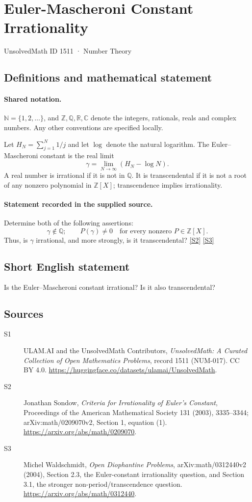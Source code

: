 \documentclass[11pt]{article}
\newcommand{\sref}[2]{\hyperlink{source:#1:#2}{[S#2]}}
\begin{document}
\setcounter{section}{1510}
\section{Euler-Mascheroni Constant Irrationality}\label{1511}
{\small\sffamily UnsolvedMath ID 1511 · Number Theory}
\subsection{Definitions and mathematical statement}

\paragraph{Shared notation.}$\mathbb N=\{1,2,\ldots\}$, and $\mathbb Z,\mathbb Q,\mathbb R,\mathbb C$ denote the integers, rationals, reals and complex numbers. Any other conventions are specified locally.


Let \(H_N=\sum_{j=1}^N1/j\) and let \(\log\) denote
the natural logarithm. The Euler--Mascheroni constant is the real limit
\[
                \gamma=\lim_{N\to\infty}(H_N-\log N).
\]
A real number is irrational if it is not in \(\mathbb Q\).
It is transcendental if it is not a root of any nonzero polynomial
in \(\mathbb Z[X]\); transcendence implies irrationality.
\paragraph{Statement recorded in the supplied source.}
Determine both of the following assertions:
\[
 \gamma\notin\mathbb Q;
 \qquad P(\gamma)\ne0\quad\text{for every nonzero }P\in\mathbb Z[X].
\]
Thus, is \(\gamma\) irrational, and more strongly, is it transcendental? \sref{1511}{2} \sref{1511}{3}
\subsection{Short English statement}
Is the Euler--Mascheroni constant irrational? Is it also transcendental?
\subsection{Sources}
\begin{description}
\item[\hypertarget{source:1511:1}{S1}] ULAM.AI and the UnsolvedMath Contributors, \emph{UnsolvedMath: A Curated Collection of Open Mathematics Problems}, record 1511 (NUM-017). CC BY 4.0. \url{https://huggingface.co/datasets/ulamai/UnsolvedMath}.
\item[\hypertarget{source:1511:2}{S2}] Jonathan Sondow, \emph{Criteria for Irrationality of Euler's Constant}, Proceedings of the American Mathematical Society 131 (2003), 3335--3344; arXiv:math/0209070v2, Section 1, equation (1). \url{https://arxiv.org/abs/math/0209070}.
\item[\hypertarget{source:1511:3}{S3}] Michel Waldschmidt, \emph{Open Diophantine Problems}, arXiv:math/0312440v2 (2004), Section 2.3, the Euler-constant irrationality question, and Section 3.1, the stronger non-period/transcendence question. \url{https://arxiv.org/abs/math/0312440}.
\end{description}
\label{end:1511}
\end{document}
